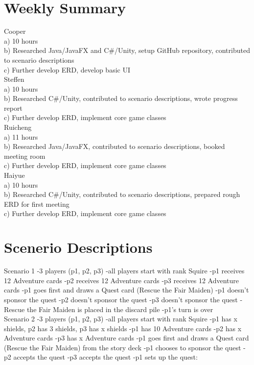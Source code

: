 \documentclass[12pt]{article} %
\begin{document}
\section*{Weekly Summary} %

Cooper\\
a) 10 hours\\
b) Researched Java/JavaFX and C\#/Unity, setup GitHub repository, contributed to scenario descriptions\\
c) Further develop ERD, develop basic UI\\

Steffen \\
a) 10 hours\\
b) Researched C\#/Unity, contributed to scenario descriptions, wrote progress report \\
c) Further develop ERD, implement core game classes\\

Ruicheng \\
a) 11 hours\\
b) Researched Java/JavaFX, contributed to scenario descriptions, booked meeting room \\
c) Further develop ERD, implement core game classes\\

Haiyue \\
a) 10 hours \\
b) Researched C\#/Unity, contributed to scenario descriptions, prepared rough ERD for first meeting \\
c) Further develop ERD, implement core game classes\\

\section*{Scenerio Descriptions}

\bgroup\obeylines
Scenario 1
-3 players (p1, p2, p3)
-all players start with rank Squire
-p1 receives 12 Adventure cards
-p2 receives 12 Adventure cards
-p3 receives 12 Adventure cards
-p1 goes first and draws a Quest card (Rescue the Fair Maiden)
-p1 doesn't sponsor the quest
-p2 doesn't sponsor the quest
-p3 doesn't sponsor the quest
-Rescue the Fair Maiden is placed in the discard pile
-p1's turn is over\\

Scenario 2
-3 players (p1, p2, p3)
-all players start with rank Squire
-p1 has x shields, p2 has 3 shields, p3 has x shields
-p1 has 10 Adventure cards
-p2 has x Adventure cards
-p3 has x Adventure cards
-p1 goes first and draws a Quest card (Rescue the Fair Maiden) from the story deck
-p1 chooses to sponsor the quest
-p2 accepts the quest
-p3 accepts the quest
-p1 sets up the quest:\\
\egroup
	
\end{document}
